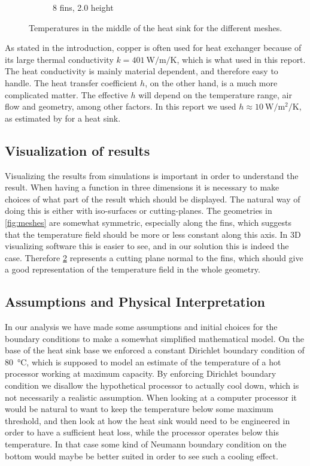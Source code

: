\begin{figure}[ht]
\begin{subfigure}[t] {0.23\textwidth}
\caption{8 fins, \num{2.0} height}
\label{fig:mesh_temps_res_8_2}
\end{subfigure}
\caption{Temperatures in the middle of the heat sink for the different meshes.}
\label{fig:mesh_temps}
\end{figure}

As stated in the introduction, copper is often used for heat exchanger because of its large thermal conductivity $k = \SI{401}{\watt\per\meter\per\kelvin}$, which is what used in this report. The heat conductivity is mainly material dependent, and therefore easy to handle. The heat transfer coefficient $h$, on the other hand, is a much more complicated matter. The effective $h$ will depend on the temperature range, air flow and geometry, among other factors. In this report we used $h \approx \SI{10}{\watt\per\meter\squared\per\kelvin}$, as estimated by \cite{heat_transfer_coeff} for a heat sink.

\subsection{Visualization of results}
Visualizing the results from simulations is important in order to understand the result. When having a function in three dimensions it is necessary to make choices of what part of the result which should be displayed. The natural way of doing this is either with iso-surfaces or cutting-planes. The geometries in \cref{fig:meshes} are somewhat symmetric, especially along the fins, which suggests that the temperature field should be more or less constant along this axis. In 3D visualizing software this is easier to see, and in our solution this is indeed the case. Therefore \cref{fig:mesh_temps} represents a cutting plane normal to the fins, which should give a good representation of the temperature field in the whole geometry.

\subsection{Assumptions and Physical Interpretation}
In our analysis we have made some assumptions and initial choices for the boundary conditions to make a somewhat simplified mathematical model. On the base of the heat sink base we enforced a constant Dirichlet boundary condition of \SI{80}{\celsius}, which is supposed to model an estimate of the temperature of a hot processor working at maximum capacity. By enforcing Dirichlet boundary condition we disallow the hypothetical processor to actually cool down, which is not necessarily a realistic assumption. When looking at a computer processor it would be natural to want to keep the temperature below some maximum threshold, and then look at how the heat sink would need to be engineered in order to have a sufficient heat loss, while the processor operates below this temperature. In that case some kind of Neumann boundary condition on the bottom would maybe be better suited in order to see such a cooling effect.

